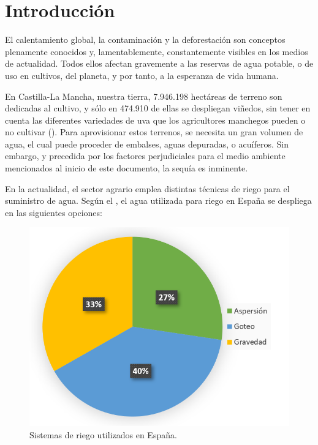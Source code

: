 
\newpage
\section{Introducción}
\label{sec:Introduction}

\justifying \setlength{\parindent}{1.27cm}
\normalsize\mdseries

El calentamiento global, la contaminación y la deforestación son conceptos plenamente conocidos y, lamentablemente, constantemente visibles en los medios de actualidad. Todos ellos afectan gravemente a las reservas de agua potable, o de uso en cultivos, del planeta, y por tanto, a la esperanza de vida humana.\newline

En Castilla-La Mancha, nuestra tierra, 7.946.198 hectáreas de terreno son dedicadas al cultivo, y sólo en 474.910 de ellas se despliegan viñedos, sin tener en cuenta las diferentes variedades de uva que los agricultores manchegos pueden o no cultivar (\cite{gob.miapa.01}). Para aprovisionar estos terrenos, se necesita un gran volumen de agua, el cual puede proceder de embalses, aguas depuradas, o acuíferos. Sin embargo, y precedida por los factores perjudiciales para el medio ambiente mencionados al inicio de este documento, la sequía es inminente.\newline

En la actualidad, el sector agrario emplea distintas técnicas de riego para el suministro de agua. Según el \cite{ine.01}, el agua utilizada para riego en España se despliega en las siguientes opciones:

\begin{figure}[h]
    \centering
    \includegraphics[scale=0.75]{figures/graphics/riego_graphic.png}
    \caption{Sistemas de riego utilizados en España.}
    \label{fig:riego_graphic}
\end{figure}

